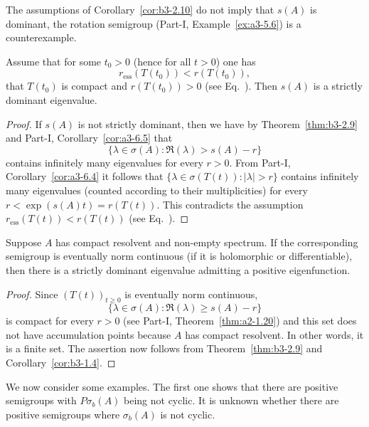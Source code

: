 The assumptions of Corollary~\ref{cor:b3-2.10} do not imply that $s(A)$ is dominant, the rotation semigroup (Part-I, Example~\ref{ex:a3-5.6}) is a counterexample.
\begin{corollary}\label{cor:b3-2.11}
	Assume that for some $t_{0} > 0$ (hence for all $t > 0$) one has 
    \[
    r_{\text{ess}}(T(t_{0})) < r(T(t_{0})), 
    \]
    \eg that $T(t_{0})$ is compact and $r(T(t_{0})) > 0$ (see Eq.~).
	Then $s(A)$ is a strictly dominant eigenvalue.
\end{corollary}
\begin{proof}
	If\/ $s(A)$ is not strictly dominant, then we have by Theorem~\ref{thm:b3-2.9} and Part-I, Corollary~\ref{cor:a3-6.5} that 
    \[
    \{\lambda \in \sigma(A) \colon \Re(\lambda) > s(A) - r\}
    \]
    contains infinitely many eigenvalues for every $r > 0$.
	From Part-I, Corollary~\ref{cor:a3-6.4} it follows that $\{\lambda \in \sigma(T(t)) \colon |\lambda| > r\}$ contains infinitely many eigenvalues (counted according to their multiplicities) for every $r < \exp(s(A)t) = r(T(t))$.
	This contradicts the assumption $r_{\text{ess}}(T(t)) < r(T(t))$ (see Eq.~).
\end{proof}
\begin{corollary}\label{cor:b3-2.12}
	Suppose $A$ has compact resolvent and non-empty spectrum.
	If the corresponding semigroup is eventually norm continuous (\eg if it is holomorphic or differentiable), then there is a strictly dominant eigenvalue admitting a positive eigenfunction.
\end{corollary}
\begin{proof}
	Since $(T(t))_{t \geq 0}$ is eventually norm continuous, 
    \[
    \{\lambda \in \sigma(A) \colon \Re(\lambda) \geq s(A)-r\}
    \]
    is compact for every $r > 0$ (see Part-I, Theorem~\ref{thm:a2-1.20}) and this set does not have accumulation points because $A$ has compact resolvent.
	In other words, it is a finite set.
	The assertion now follows from Theorem~\ref{thm:b3-2.9} and Corollary~\ref{cor:b3-1.4}.
\end{proof}
We now consider some examples. 
The first one shows that there are positive semigroups with $P\sigma_{b}(A)$ being not cyclic.
It is unknown whether there are positive semigroups where $\sigma_{b}(A)$ is not cyclic.

